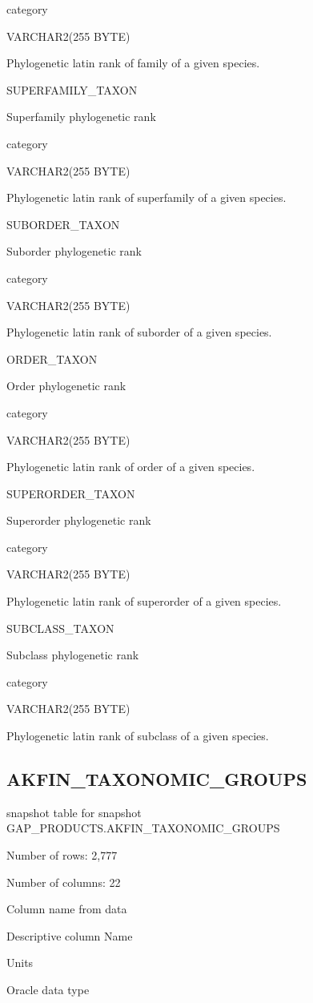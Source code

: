 \documentclass[
  letterpaper,
  oneside,
  open=any]{scrbook}
\begin{document}
category

VARCHAR2(255 BYTE)

Phylogenetic latin rank of family of a given species.

SUPERFAMILY\_TAXON

Superfamily phylogenetic rank

category

VARCHAR2(255 BYTE)

Phylogenetic latin rank of superfamily of a given species.

SUBORDER\_TAXON

Suborder phylogenetic rank

category

VARCHAR2(255 BYTE)

Phylogenetic latin rank of suborder of a given species.

ORDER\_TAXON

Order phylogenetic rank

category

VARCHAR2(255 BYTE)

Phylogenetic latin rank of order of a given species.

SUPERORDER\_TAXON

Superorder phylogenetic rank

category

VARCHAR2(255 BYTE)

Phylogenetic latin rank of superorder of a given species.

SUBCLASS\_TAXON

Subclass phylogenetic rank

category

VARCHAR2(255 BYTE)

Phylogenetic latin rank of subclass of a given species.

\subsection{AKFIN\_TAXONOMIC\_GROUPS}\label{akfin_taxonomic_groups}

snapshot table for snapshot GAP\_PRODUCTS.AKFIN\_TAXONOMIC\_GROUPS

Number of rows: 2,777

Number of columns: 22

Column name from data

Descriptive column Name

Units

Oracle data type
\end{document}
